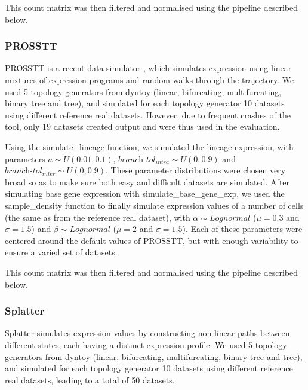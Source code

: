This count matrix was then filtered and normalised using the pipeline described below.

\subsubsection{PROSSTT}

PROSSTT is a recent data simulator \cite{papadopoulos_prossttprobabilisticsimulation_2018}, which simulates expression using linear mixtures of expression programs and random walks through the trajectory. We used 5 topology generators from dyntoy (linear, bifurcating, multifurcating, binary tree and tree), and simulated for each topology generator 10 datasets using different reference real datasets. However, due to frequent crashes of the tool, only 19 datasets created output and were thus used in the evaluation.

Using the simulate\_lineage function, we simulated the lineage expression, with parameters $a \sim U(0.01, 0.1)$, $\textit{branch-tol}_{\textit{intra}} \sim U(0, 0.9)$ and $\textit{branch-tol}_{\textit{inter}} \sim U(0, 0.9)$. These parameter distributions were chosen very broad so as to make sure both easy and difficult datasets are simulated. After simulating base gene expression with simulate\_base\_gene\_exp, we used the sample\_density function to finally simulate expression values of a number of cells (the same as from the reference real dataset), with $\alpha \sim \textit{Lognormal}$ ($\mu = 0.3$ and $\sigma = 1.5$) and $\beta \sim \textit{Lognormal}$ ($\mu = 2$ and $\sigma = 1.5$). Each of these parameters were centered around the default values of PROSSTT, but with enough variability to ensure a varied set of datasets.

This count matrix was then filtered and normalised using the pipeline described below.

\subsubsection{Splatter}

Splatter \cite{zappia_splattersimulationsinglecell_2017} simulates expression values by constructing non-linear paths between different states, each having a distinct expression profile. We used 5 topology generators from dyntoy (linear, bifurcating, multifurcating, binary tree and tree), and simulated for each topology generator 10 datasets using different reference real datasets, leading to a total of 50 datasets.

